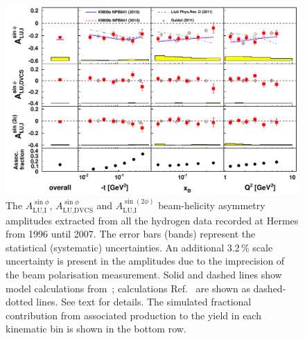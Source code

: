\begin{figure}
 \begin{center}
 \includegraphics[width=15cm]{bsadvcsplots_eml_par13_bin6_release_all_pic_cluster_update2}
  \caption{The $A_{\textrm{LU,I}}^{\sin\phi}$, $A_{\textrm{LU,DVCS}}^{\sin\phi}$ and
$A_{\textrm{LU,I}}^{\sin(2\phi)}$ beam-helicity asymmetry amplitudes extracted from all the hydrogen data recorded at H{\sc ermes}
from 1996 until 2007. The error bars (bands) represent the statistical
(systematic) uncertainties. An additional 3.2\,\% scale uncertainty is present in the amplitudes due to the imprecision of
the beam polarisation measurement. Solid and dashed lines show model calculations from~\cite{Kum09}; calculations  Ref.~\cite{Liu11} are shown as dashed-dotted lines. See text for details. The simulated fractional contribution from associated production to the yield in each kinematic bin is shown in the bottom row.}
  \label{bsa_xbjrange}
 \end{center}
\end{figure}

